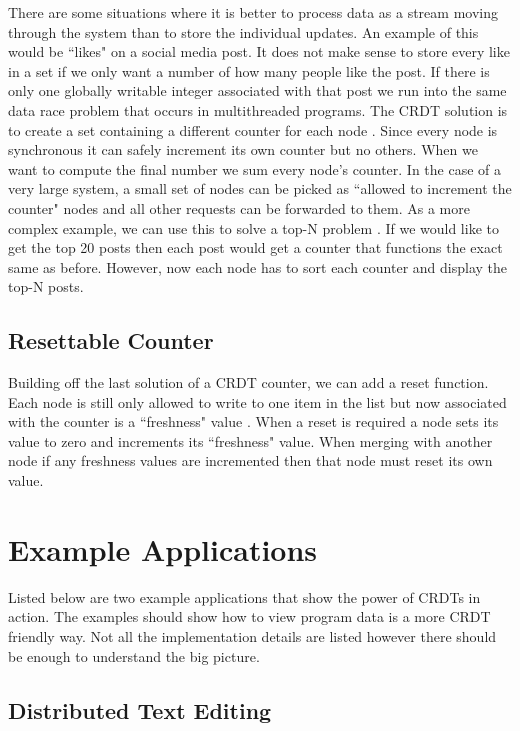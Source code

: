 \documentclass{article}
\begin{document}
\begin{multicols}{2}
\begin{refsection}
There are some situations where it is better to process data as a stream moving through the system than to store the individual updates. An example of this would be ``likes" on a social media post. It does not make sense to store every like in a set if we only want a number of how many people like the post. If there is only one globally writable integer associated with that post we run into the same data race problem that occurs in multithreaded programs. The CRDT solution is to create a set containing a different counter for each node \cite{navalho_incremental_2013}. Since every node is synchronous it can safely increment its own counter but no others. When we want to compute the final number we sum every node's counter. In the case of a very large system, a small set of nodes can be picked as ``allowed to increment the counter" nodes and all other requests can be forwarded to them. As a more complex example, we can use this to solve a top-N problem \cite{navalho_incremental_2013}. If we would like to get the top 20 posts then each post would get a counter that functions the exact same as before. However, now each node has to sort each counter and display the top-N posts.

\subsection*{Resettable Counter}

Building off the last solution of a CRDT counter, we can add a reset function. Each node is still only allowed to write to one item in the list but now associated with the counter is a ``freshness" value \cite{baquero_problem_2016}. When a reset is required a node sets its value to zero and increments its ``freshness" value. When merging with another node if any freshness values are incremented then that node must reset its own value. 


\section*{Example Applications}

Listed below are two example applications that show the power of CRDTs in action. The examples should show how to view program data is a more CRDT friendly way. Not all the implementation details are listed however there should be enough to understand the big picture.

\subsection*{Distributed Text Editing}


\end{refsection}
\end{multicols}
\end{document}
